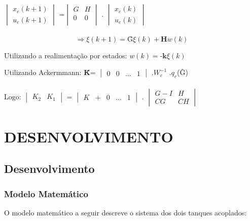 \documentclass[a4paper,12pt]{article}
\begin{document}
$
\begin{vmatrix}
x_{e}(k+1)\\
u_{e}(k+1)
\end{vmatrix}
$
=$\begin{vmatrix}
G & H \\
0 & 0 \\
\end{vmatrix}
$
. $
\begin{vmatrix}
x_{e}(k)\\
u_{e}(k)
\end{vmatrix}
$
\\
\\

$$\Rightarrow \xi(k+1)=\textbf{\^G}\xi(k)+\textbf{H}w(k)$$

Utilizando a realimentação por estados: $w(k)=\textbf{-\^{k}}\xi(k)$

Utilizando Ackermmann: \textbf{\^K}=
$
\begin{vmatrix}
 0 & 0 & ...&1
\end{vmatrix}
$
.$W_{c}^{-1}$
.$q_{c}$(\^{G})
\\
\\
Logo:
$
\begin{vmatrix}
K_{2} & K_{1} 
\end{vmatrix}$
= $
\begin{vmatrix}
K & + & 0 &... & 1
\end{vmatrix}$
. $
\begin{vmatrix}
G-I & H \\
CG  & CH
\end{vmatrix}$
\newpage


\thispagestyle{main}

\section{DESENVOLVIMENTO}
\subsection{Desenvolvimento}
\subsubsection{Modelo Matemático}
O modelo matemático a seguir descreve o sistema dos dois tanques acoplados:\\
\end{document}
